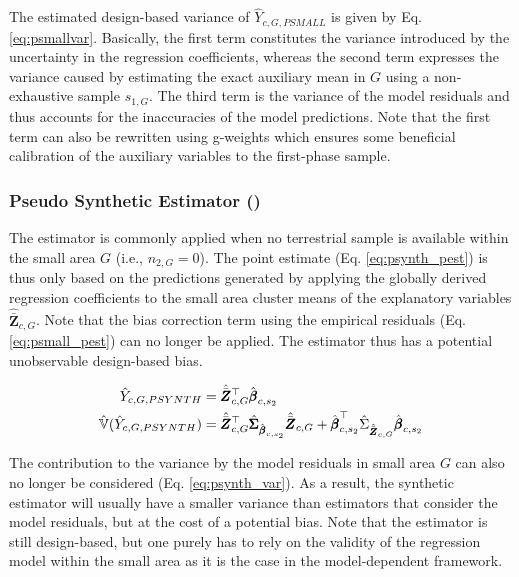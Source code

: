 The estimated design-based variance of $ \hat{Y}_{c,G,PSMALL}$ is given by Eq. \ref{eq:psmallvar}. Basically, the first term constitutes the variance introduced by the uncertainty in the regression coefficients, whereas the second term expresses the variance caused by estimating the exact auxiliary mean in $G$ using a non-exhaustive sample $s_{1,G}$. The third term is the variance of the model residuals and thus accounts for the inaccuracies of the model predictions. Note that the first term can also be rewritten using g-weights \cite[pg.14]{mandallaz2016} which ensures some beneficial calibration of the auxiliary variables to the first-phase sample.\\


\subsubsection{Pseudo Synthetic Estimator (\psynth{})}
\label{sec:psynth}

The \psynth{} estimator is commonly applied when no terrestrial sample is available within the small area $G$ (i.e., $n_{2,G}=0$). The point estimate (Eq. \ref{eq:psynth_pest}) is thus only based on the predictions generated by applying the globally derived regression coefficients to the small area cluster means of the explanatory variables $\hat{\bar{\pmb{Z}}}_{c,G}$. Note that the bias correction term using the empirical residuals (Eq. \ref{eq:psmall_pest}) can no longer be applied. The \psynth{} estimator thus has a potential unobservable design-based bias.

\begin{subequations}\label{eq:psynth}
	\begin{align}
	\hat{Y}_{c,G,PSYNTH} & =\hat{\bar{\pmb{Z}}}_{c,G}^{\top}\hat{\pmb{\beta}}_{c,s_2} \label{eq:psynth_pest} \\
	\hat{\mathbb{V}}(\hat{Y}_{c,G,PSYNTH})& =
	\hat{\bar{\pmb{Z}}}_{c,G}^{\top}\hat{\pmb{\Sigma}}_{\hat{\pmb{\beta}}_{c,s_2}}
	\hat{\bar{\pmb{Z}}}_{c,G}
	+ \hat{\pmb{\beta}}^{\top}_{c,s_2}\hat{\Sigma}_{\hat{\bar{\pmb{Z}}}_{c,G}}\hat{\pmb{\beta}}_{c,s_2} \label{eq:psynth_var}
	\end{align}
\end{subequations}

The contribution to the variance by the model residuals in small area $G$ can also no longer be considered (Eq. \ref{eq:psynth_var}). As a result, the synthetic estimator will usually have a smaller variance than estimators that consider the model residuals, but at the cost of a potential bias. Note that the \psynth{} estimator is still design-based, but one purely has to rely on the validity of the regression model within the small area as it is the case in the model-dependent framework.\\

